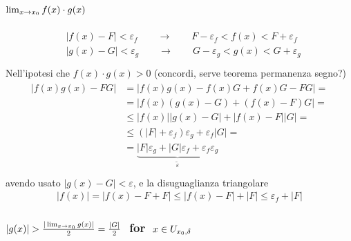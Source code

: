 \documentclass[letterpaper,10pt,italian]{jupyterBook}
\begin{document}
\subsubsection*{\protect\(\lim_{x \rightarrow x_0} f(x) \cdot g(x)\protect\)}
\begin{equation*}
\begin{split}\begin{aligned}
  & |f(x) - F| < \varepsilon_f \qquad \rightarrow \qquad F - \varepsilon_f < f(x) < F + \varepsilon_f \\
  & |g(x) - G| < \varepsilon_g \qquad \rightarrow \qquad G - \varepsilon_g < g(x) < G + \varepsilon_g \\
\end{aligned}\end{split}
\end{equation*}
\sphinxAtStartPar
Nell’ipotesi che \(f(x) \cdot g(x) > 0\) (concordi, serve teorema permanenza segno?)
\begin{equation*}
\begin{split}\begin{aligned}
   |f(x) g(x) - F G|
   &   = |f(x) g(x) - f(x) G + f(x) G - F G| = \\
   &   = |f(x) ( g(x) - G ) + ( f(x) - F ) G| = \\
   & \le |f(x)|| g(x) - G | + | f(x) - F || G| = \\
   & \le (|F|+\varepsilon_f)\varepsilon_g + \varepsilon_f|G| = \\
   & = \underbrace{|F|\varepsilon_g + |G|\varepsilon_f + \varepsilon_f \varepsilon_g}_{\tilde{\varepsilon}} \\
\end{aligned}\end{split}
\end{equation*}
\sphinxAtStartPar
avendo usato \(|g(x)-G| < \varepsilon\), e la disuguaglianza triangolare
\begin{equation*}
\begin{split}|f(x)| = |f(x) - F + F| \le |f(x) - F| + |F| \le \varepsilon_f + |F| \end{split}
\end{equation*}\subsubsection*{\protect\(|g(x)| > \frac{|\lim_{x\rightarrow x_0} g(x)|}{2} = \frac{|G|}{2} \ \protect\) for \protect\(\  x \in U_{x_0, \delta}\protect\)}
\end{document}
